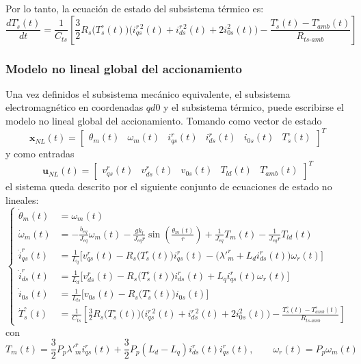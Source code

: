 \documentclass[12pt, a4paper,journal, onecolumn, compsoc]{IEEEtran}
\begin{document}
    Por lo tanto, la ecuación de estado del subsistema térmico es:
    \begin{equation}
        \frac{dT_s^\circ(t)}{dt}=\frac{1}{C_{ts}}\left[\frac{3}{2}R_s\big(T_s^\circ(t)\big)\Big(i_{qs}^{r\,2}(t)+i_{ds}^{r\,2}(t)+2i_{0s}^{2}(t)\Big)-\frac{T_s^\circ(t)-T_{amb}^\circ(t)}{R_{ts\text{-}amb}}\right]
    \end{equation}

    \subsubsection{Modelo no lineal global del accionamiento}
    Una vez definidos el subsistema mecánico equivalente, el subsistema electromagnético en coordenadas \(qd0\) y el subsistema térmico, puede escribirse el modelo no lineal global del accionamiento. Tomando como vector de estado
    \[
        \mathbf{x}_{NL}(t)=\begin{bmatrix}
            \theta_m(t) & \omega_m(t) & i_{qs}^r(t) & i_{ds}^r(t) & i_{0s}(t) & T_s^\circ(t)
        \end{bmatrix}^T
    \]
    y como entradas
    \[
        \mathbf{u}_{NL}(t)=\begin{bmatrix}
            v_{qs}^r(t) & v_{ds}^r(t) & v_{0s}(t) & T_{ld}(t) & T_{amb}^\circ(t)
        \end{bmatrix}^T
    \]
    el sistema queda descrito por el siguiente conjunto de ecuaciones de estado no lineales:
    \begin{equation}
    \left\{
        \begin{aligned}
            \dot{\theta}_m(t) &= \omega_m(t) \\[6pt]
            \dot{\omega}_m(t) &= -\frac{b_{eq}}{J_{eq}}\omega_m(t)-\frac{gk_l}{J_{eq}r}\sin\left(\frac{\theta_m(t)}{r}\right)+\frac{1}{J_{eq}}T_m(t)-\frac{1}{J_{eq}r}T_{ld}(t) \\[6pt]
            \dot{i}_{qs}^r(t) &= \frac{1}{L_q}\Big[v_{qs}^r(t)-R_s\big(T_s^\circ(t)\big)i_{qs}^r(t)-\big(\lambda'^r_m+L_d i_{ds}^r(t)\big)\omega_r(t)\Big] \\[6pt]
            \dot{i}_{ds}^r(t) &= \frac{1}{L_d}\Big[v_{ds}^r(t)-R_s\big(T_s^\circ(t)\big)i_{ds}^r(t)+L_q i_{qs}^r(t)\omega_r(t)\Big] \\[6pt]
            \dot{i}_{0s}(t) &= \frac{1}{L_{ls}}\Big[v_{0s}(t)-R_s\big(T_s^\circ(t)\big)i_{0s}(t)\Big] \\[6pt]
            \dot{T}_s^\circ(t) &= \frac{1}{C_{ts}}\left[\frac{3}{2}R_s\big(T_s^\circ(t)\big)\Big(i_{qs}^{r\,2}(t)+i_{ds}^{r\,2}(t)+2i_{0s}^{2}(t)\Big)-\frac{T_s^\circ(t)-T_{amb}^\circ(t)}{R_{ts\text{-}amb}}\right]
        \end{aligned}
    \right.
    \end{equation}
    con
    \begin{equation}
        T_m(t)=\frac{3}{2} P_p \lambda'^r_m i_{qs}^r(t)+\frac{3}{2}P_p(L_d-L_q)i_{ds}^r(t)i_{qs}^r(t),
        \qquad
        \omega_r(t)=P_p\omega_m(t)
    \end{equation}
\end{document}
